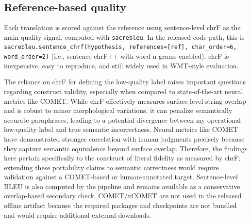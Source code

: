 \documentclass[10pt,conference]{IEEEtran}
\begin{document}
\subsection{Reference-based quality}
Each translation is scored against the reference using sentence-level chrF as the main quality signal, computed with \texttt{sacrebleu}. In the released code path, this is \texttt{sacrebleu.sentence\_chrf(hypothesis, references=[ref], char\_order=6, word\_order=2)} (i.e., sentence chrF++ with word n-grams enabled). chrF is inexpensive, easy to reproduce, and still widely used in WMT-style evaluation.

The reliance on chrF for defining the low-quality label raises important questions regarding construct validity, especially when compared to state-of-the-art neural metrics like COMET. While chrF effectively measures surface-level string overlap and is robust to minor morphological variations, it can penalize semantically accurate paraphrases, leading to a potential divergence between my operational low-quality label and true semantic incorrectness. Neural metrics like COMET have demonstrated stronger correlation with human judgments precisely because they capture semantic equivalence beyond surface overlap. Therefore, the findings here pertain specifically to the construct of literal fidelity as measured by chrF; extending these portability claims to semantic correctness would require validation against a COMET-based or human-annotated target. Sentence-level BLEU is also computed by the pipeline and remains available as a conservative overlap-based secondary check. COMET/xCOMET are not used in the released offline artifact because the required packages and checkpoints are not bundled and would require additional external downloads.
\end{document}
